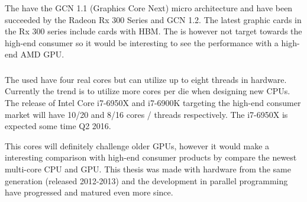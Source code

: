 The {\AMDCARD} have the GCN 1.1 (Graphics Core Next) micro architecture and have been succeeded by the Radeon Rx 300 Series and GCN 1.2. The latest graphic cards in the Rx 300 series include cards with HBM. The {\AMDCARD} is however not target towards the high-end consumer so it would be interesting to see the performance with a high-end AMD GPU.

\subsubsection{\INTELCPU}

The used {\INTELCPU} have four real cores but can utilize up to eight threads in hardware. Currently the trend is to utilize more cores per die when designing new CPUs. The release of Intel Core i7-6950X and i7-6900K targeting the high-end consumer market will have 10/20 and 8/16 cores / threads respectively. The i7-6950X is expected some time Q2 2016.

This cores will definitely challenge older GPUs, however it would make a interesting comparison with high-end consumer products by compare the newest multi-core CPU and GPU. This thesis was made with hardware from the same generation (released 2012-2013) and the development in parallel programming have progressed and matured even more since.